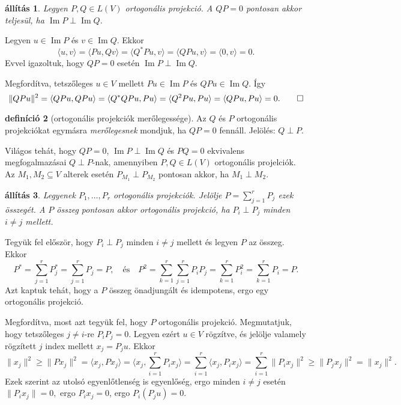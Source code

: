 \documentclass[9pt, a4paper, showtrims]{memoir}
\makeatletter
\renewenvironment{proof}[1][\proofname]
    {\par\pushQED{\qed}%
    \normalfont \topsep6\p@\@plus6\p@\relax
    \trivlist
    \item[\hskip\labelsep
        \itshape
    #1\@addpunct{:}]\ignorespaces}
    {\popQED\endtrivlist\@endpefalse}
\theoremstyle{plain}
\newtheorem{proposition}{állítás}[chapter]
\theoremstyle{remark}
\theoremstyle{definition}
\newtheorem{definition}[proposition]{definíció}
\DeclareMathOperator{\im}{Im}
\newcommand{\ip}[2]{\langle#1,#2\rangle}
\makeatother
\begin{document}
\begin{proposition}
	Legyen $P,Q\in L\left( V \right)$ ortogonális projekció.
	A $QP=0$ pontosan akkor teljesül, ha $\im P\perp\im Q$.
\end{proposition}
\begin{proof}
	Legyen $u\in \im P$ és $v\in \im Q$.
	Ekkor
	\[
		\ip{u}{v}
		=
		\ip{Pu}{Qv}
		=
		\ip{Q^\ast Pu}{v}
		=
		\ip{QPu}{v}
		=
		\ip{0}{v}
		=
		0.
	\]
	Evvel igazoltuk, hogy $QP=0$ esetén $\im P\perp\im Q$.

	Megfordítva, tetszőleges $u\in V$ mellett $Pu\in\im P$ és $QPu\in\im Q$.
	Így
	\[
		\|QPu\|^2
		=
		\ip{QPu}{QPu}
		=
		\ip{Q^\ast QPu}{Pu}
		=
		\ip{Q^2Pu}{Pu}
		=
		\ip{QPu}{Pu}
		=
		0.
		\qedhere
	\]
\end{proof}
\begin{definition}[ortogonális projekciók merőlegessége]
	Az $Q$ és $P$ ortogonális projekciókat egymásra \emph{merőlegesnek} mondjuk, ha $QP=0$ fennáll.
	Jelölés: $Q\perp P$.
\end{definition}
Világos tehát, hogy $QP=0$, $\im P\perp \im Q$ és $PQ=0$ ekvivalens megfogalmazásai $Q\perp P$-nak,
amennyiben $P,Q\in L\left( V \right)$ ortogonális projelciók.
Az $M_1, M_2\subseteq V$ alterek esetén $P_{M_1}\perp P_{M_2}$ pontosan akkor, ha $M_1\perp M_2$.
\begin{proposition}
	Legyenek $P_1,\ldots,P_r$ ortogonális projekciók.
	Jelölje $P=\sum_{j=1}^rP_j$ ezek összegét.
	A $P$ összeg pontosan akkor ortogonális projekció, ha $P_i\perp P_j$ minden $i\neq j$ mellett.
\end{proposition}
\begin{proof}
    Tegyük fel először, hogy $P_i\perp P_j$ minden $i\neq j$ mellett és legyen $P$ az összeg.
    Ekkor
    \[
        P^\ast
        =
        \sum_{j=1}^rP_j^\ast
        =
        \sum_{j=1}^rP_j
        =
        P,
        \quad\text{és}\quad
        P^2
        =
        \sum_{k=1}^r\sum_{j=1}^rP_iP_j
        =
        \sum_{k=1}^rP_i^2
        =
        \sum_{k=1}^rP_i
        =
        P.
    \]
    Azt kaptuk tehát, hogy a $P$ összeg önadjungált és idempotens,
    ergo egy ortogonális projekció.

    Megfordítva, most azt tegyük fel, hogy $P$ ortogonális projekció.
    Megmutatjuk, hogy tetszőleges $j\neq i$-re
    $P_iP_j=0$.
    Legyen ezért $u\in V$ rögzítve, és jelölje valamely rögzített $j$ index mellett $x_j=P_ju$.
    Ekkor
    \[
        \|x_j\|^2
        \geq
        \|Px_j\|^2
        =
        \ip{x_j}{Px_j}
        =
        \ip{x_j}{\sum_{i=1}^rP_ix_j}
        =
        \sum_{i=1}^r\ip{x_j}{P_ix_j}
        =
        \sum_{i=1}^r\|P_ix_j\|^2
        \geq
        \|P_jx_j\|^2
        =
        \|x_j\|^2.
    \]
    Ezek szerint az utolsó egyenlőtlenség is egyenlőség, 
    ergo minden $i\neq j$ esetén
    \(
    \|P_ix_j\|=0,
    \)
    ergo
    \(P_ix_j=0\),
    ergo
    $P_i\left( P_ju \right)=0.$
\end{proof}
\end{document}
